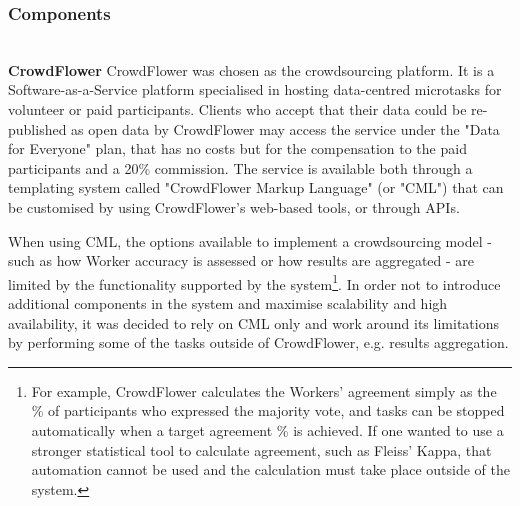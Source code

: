 \begin{figure}[!ht]
    \begin{floatrow}
   \end{floatrow}
\end{figure}


\subsubsection{Components} \leavevmode \\ %

\textbf{CrowdFlower} CrowdFlower was chosen as the crowdsourcing platform. It is a Software-as-a-Service platform specialised in hosting data-centred microtasks for volunteer or paid participants. Clients who accept that their data could be re-published as open data by CrowdFlower may access the service under the "Data for Everyone" plan, that has no costs but for the compensation to the paid participants and a 20\% commission. The service is available both through a templating system called "CrowdFlower Markup Language" (or "CML") that can be customised by using CrowdFlower's web-based tools, or through APIs. 

When using CML, the options available to implement a crowdsourcing model - such as how Worker accuracy is assessed or how results are aggregated - are limited by the functionality supported by the system\footnote{For example, CrowdFlower calculates the Workers' agreement simply as the \% of participants who expressed the majority vote, and tasks can be stopped automatically when a target agreement \% is achieved. If one wanted to use a stronger statistical tool to calculate agreement, such as Fleiss' Kappa, that automation cannot be used and the calculation must take place outside of the system.}. In order not to introduce additional components in the system and maximise scalability and high availability, it was decided to rely on CML only and work around its limitations by performing some of the tasks outside of CrowdFlower, e.g. results aggregation. 

